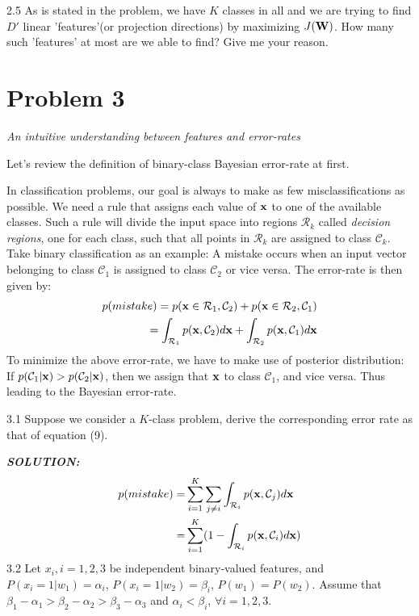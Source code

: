 \documentclass{article}
\theoremstyle{definition}
\theoremstyle{definition}
\theoremstyle{remark}
\begin{document}
2.5 As is stated in the problem, we have $K$ classes in all and we are trying to find $D'$ linear 'features'(or projection directions) by maximizing $J(\bold{W})$. How many such 'features' at most are we able to find? Give me your reason.

\section*{Problem 3}\label{problem:3}
\emph{An intuitive understanding between features and error-rates}

Let's review the definition of binary-class Bayesian error-rate at first.

In classification problems, our goal is always to make as few misclassifications as possible. We need a rule that assigns each value of $\bold{x}$ to one of the available classes. Such a rule will divide the input space into regions $\mathcal{R}_{k}$ called \emph{decision regions}, one for each class, such that all points in $\mathcal{R}_{k}$ are assigned to class $\mathcal{C}_{k}$. Take binary classification as an example: A mistake occurs when an input vector belonging to class $\mathcal{C}_{1}$ is assigned to class $\mathcal{C}_{2}$ or vice versa. The error-rate is then given by:
\begin{eqnarray}
p(mistake)=p(\bold{x}\in \mathcal{R}_{1}, \mathcal{C}_{2})+p(\bold{x}\in \mathcal{R}_{2}, \mathcal{C}_{1})\\
=\int_{\mathcal{R}_{1}}p(\bold{x},\mathcal{C}_{2})d\bold{x}+\int_{\mathcal{R}_{2}}p(\bold{x},\mathcal{C}_{1})d\bold{x}
\end{eqnarray}
To minimize the above error-rate, we have to make use of posterior distribution: If $p(\mathcal{C}_{1}|\bold{x})>p(\mathcal{C}_{2}|\bold{x})$, then we assign that $\bold{x}$ to class $\mathcal{C}_{1}$, and vice versa. Thus leading to the Bayesian error-rate.

3.1 Suppose we consider a $K$-class problem, derive the corresponding error rate as that of equation (9).

\emph{\textbf{SOLUTION:}}
\begin{equation}\nonumber
\begin{aligned}
p(mistake)=&\sum_{i=1}^{K}\sum_{j\neq i}\int_{\mathcal{R}_{i}}p(\bold{x},\mathcal{C}_{j})d\bold{x}\\
=&\sum_{i=1}^{K}(1-\int_{\mathcal{R}_{i}}p(\bold{x},\mathcal{C}_{i})d\bold{x})
\end{aligned}
\end{equation}
3.2 Let $x_{i}, i=1, 2, 3$ be independent binary-valued features, and $P(x_{i}=1|w_{1})=\alpha_{i}$, $P(x_{i}=1|w_{2})=\beta_{i}$, $P(w_{1})=P(w_{2})$. Assume that $\beta_{1}-\alpha_{1}>\beta_{2}-\alpha_{2}>\beta_{3}-\alpha_{3}$ and $\alpha_{i}<\beta_{i}$, $\forall i=1, 2, 3$.
\end{document}
